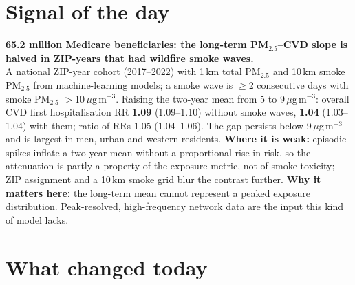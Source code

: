 \documentclass[10pt]{article}
\begin{document}
\vspace{6mm}

\section*{\sffamily\bfseries\color{Deep}Signal of the day}
\vspace{-1.5mm}{\color{Amber}\rule{\linewidth}{1.1pt}}\vspace{2.5mm}

\begin{keybox}
{\sffamily\bfseries\small\color{Deep}65.2 million Medicare beneficiaries: the long-term PM$_{2.5}$--CVD
slope is halved in ZIP-years that had wildfire smoke waves.}\\[1.4mm]
\footnotesize
A national ZIP-year cohort (2017--2022) with 1\,km total PM$_{2.5}$ and 10\,km smoke PM$_{2.5}$ from machine-learning
models; a smoke wave is $\geq$2 consecutive days with smoke PM$_{2.5}$ $>$10\,$\mu$g\,m$^{-3}$. Raising the two-year mean
from 5 to 9\,$\mu$g\,m$^{-3}$: overall CVD first hospitalisation RR \textbf{1.09} (1.09--1.10) without smoke waves,
\textbf{1.04} (1.03--1.04) with them; ratio of RRs 1.05 (1.04--1.06). The gap persists below 9\,$\mu$g\,m$^{-3}$ and is
largest in men, urban and western residents.
\textbf{Where it is weak:} episodic spikes inflate a two-year mean without a proportional rise in risk, so the
attenuation is partly a property of the exposure metric, not of smoke toxicity; ZIP assignment and a 10\,km smoke grid
blur the contrast further.
\textbf{Why it matters here:} the long-term mean cannot represent a peaked exposure distribution. Peak-resolved,
high-frequency network data are the input this kind of model lacks.\par
\end{keybox}

\vspace{3mm}

\section*{\sffamily\bfseries\color{Deep}What changed today}
\vspace{-1.5mm}{\color{Amber}\rule{\linewidth}{1.1pt}}\vspace{2.5mm}
\end{document}
